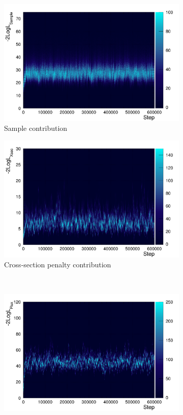 \begin{figure}
\centering
\begin{subfigure}{.5\textwidth}
  \centering
  \includegraphics[width=0.85\linewidth]{figs/llh_sam}
  \caption{Sample contribution}
\end{subfigure}%
\begin{subfigure}{.5\textwidth}
  \centering
  \includegraphics[width=0.85\linewidth]{figs/llh_xsec}
  \caption{Cross-section penalty contribution}
\end{subfigure} \\
\begin{subfigure}{.5\textwidth}
  \centering
  \includegraphics[width=0.85\linewidth]{figs/llh_flux}

\end{subfigure}
\end{figure}
